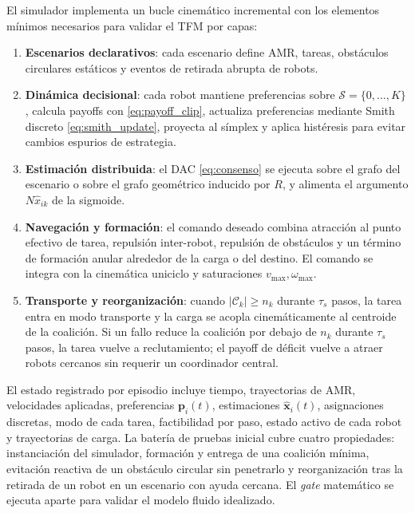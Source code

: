 El simulador implementa un bucle cinemático incremental con
los elementos mínimos necesarios para validar el TFM por capas:
\begin{enumerate}
  \item \textbf{Escenarios declarativos}: cada escenario define AMR, tareas,
  obstáculos circulares estáticos y eventos de retirada abrupta de robots.
  \item \textbf{Dinámica decisional}: cada robot mantiene preferencias sobre
  $\mathcal{S}=\{0,\ldots,K\}$, calcula payoffs con
  \eqref{eq:payoff_clip}, actualiza preferencias mediante Smith discreto
  \eqref{eq:smith_update}, proyecta al símplex y aplica histéresis para evitar cambios
  espurios de estrategia.
  \item \textbf{Estimación distribuida}: el DAC \eqref{eq:consenso} se ejecuta sobre el
  grafo del escenario o sobre el grafo geométrico inducido por $R$, y alimenta el
  argumento $N\hat{x}_{ik}$ de la sigmoide.
  \item \textbf{Navegación y formación}: el comando deseado combina atracción al punto
  efectivo de tarea, repulsión inter-robot, repulsión de obstáculos y un término de
  formación anular alrededor de la carga o del destino. El comando se integra con la
  cinemática uniciclo y saturaciones $v_{\max},\omega_{\max}$.
  \item \textbf{Transporte y reorganización}: cuando
  $|\mathcal{C}_k|\ge n_k$ durante $\tau_s$ pasos, la tarea entra en modo transporte y
  la carga se acopla cinemáticamente al centroide de la coalición. Si un fallo reduce
  la coalición por debajo de $n_k$ durante $\tau_s$ pasos, la tarea vuelve a
  reclutamiento; el payoff de déficit vuelve a atraer robots cercanos sin requerir un
  coordinador central.
\end{enumerate}

El estado registrado por episodio incluye tiempo, trayectorias de AMR, velocidades
aplicadas, preferencias $\mathbf{p}_i(t)$, estimaciones $\hat{\mathbf{x}}_i(t)$,
asignaciones discretas, modo de cada tarea, factibilidad por paso, estado activo de
cada robot y trayectorias de carga. La batería de pruebas inicial cubre cuatro
propiedades: instanciación del simulador, formación y entrega de una coalición mínima,
evitación reactiva de un obstáculo circular sin penetrarlo y reorganización tras la
retirada de un robot en un escenario con ayuda cercana. El \emph{gate} matemático
se ejecuta aparte para validar el modelo fluido idealizado.

